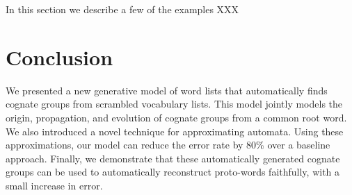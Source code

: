 \documentclass[11pt,a4paper]{article}
\begin{document}
In this section we describe a few of the examples XXX

\section{Conclusion}

We presented a new generative model of word lists that automatically
finds cognate groups from scrambled vocabulary lists. This model
jointly models the origin, propagation, and evolution of cognate
groups from a common root word. We also introduced a novel technique
for approximating automata. Using these approximations, our model
can reduce the error rate by 80\% over a baseline approach. Finally,
we demonstrate that these automatically generated cognate groups
can be used to automatically reconstruct proto-words faithfully,
with a small increase in error.



\end{document}
